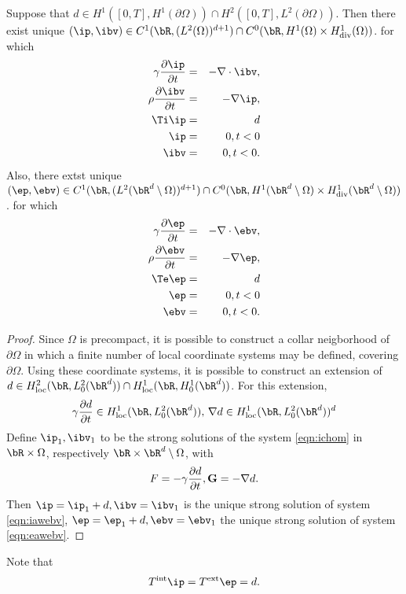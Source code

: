 \begin{thm}
  Suppose that
  $d \in H^1([0,T], H^1(\partial \Omega)) \cap H^2([0,T],L^2(\partial
  \Omega))$. Then there exist unique 
$(\ip,\ibv) \in C^1(\bR,(L^2(\Omega))^{d+1}) \cap C^0(\bR,  H^1(\Omega) 
\times H^1_{\rm div}(\Omega))$.
for which
\begin{eqnarray}
\label{eqn:iawebv}
\gamma \frac{\partial \ip}{\partial t} & = & - \nabla \cdot \ibv, \nonumber \\
\rho \frac{\partial \ibv}{\partial t} & = & - \nabla \ip,\nonumber \\
\Ti \ip & = & d \\
\ip & = & 0, t < 0\\
\ibv & = & 0, t < 0.
\end{eqnarray}
Also, there extst unique 
$(\ep,\ebv) \in C^1(\bR,(L^2(\bR^d \setminus \Omega))^{d+1}) \cap C^0(\bR,  H^1(\bR^d \setminus \Omega) 
\times H^1_{\rm div}(\bR^d \setminus \Omega))$.
for which
\begin{eqnarray}
\label{eqn:eawebv}
\gamma \frac{\partial \ep}{\partial t} & = & - \nabla \cdot \ebv, \nonumber \\
\rho \frac{\partial \ebv}{\partial t} & = & - \nabla \ep,\nonumber \\
\Te \ep & = & d \\
\ep & = & 0, t < 0\\
\ebv & = & 0, t < 0.
\end{eqnarray}
\end{thm}
\begin{proof}
Since $\Omega$ is precompact, it is possible to construct a collar
neigborhood of $\partial \Omega$ in which a finite number of local
coordinate systems may be defined, covering $\partial \Omega$. Using
these coordinate systems, it is possible to construct an extension of 
$d \in H^2_{\rm loc}(\bR,L^2_0(\bR^d)) \cap
H^1_{\rm loc}(\bR,H^1_0(\bR^d))$. For this extension,
\[
\gamma\frac{\partial d}{\partial t} \in H^1_{\rm
  loc}(\bR,L^2_0(\bR^d)), \,
\nabla d \in H^1_{\rm
  loc}(\bR,L^2_0(\bR^d))^d
\]
Define $\ip_1, \ibv_1$ to be the strong solutions of the system
\ref{eqn:ichom} in $\bR \times \Omega$, respectively $\bR \times \bR^d
\setminus \Omega$, with 
\[
F = -\gamma\frac{\partial d}{\partial t}, {\bf G} = -\nabla d.
\]
Then $\ip = \ip_1 + d, \ibv = \ibv_1$ is the unique strong solution of
system \ref{eqn:iawebv}, $\ep = \ep_1 + d, \ebv = \ebv_1$ the unique
strong solution of system \ref{eqn:eawebv}.
\end{proof}

Note that
\begin{equation}
\label{eqn:trace}
T^{\rm  int}\ip = T^{\rm ext}\ep = d.
\end{equation}
 
